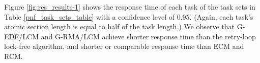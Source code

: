 \documentclass[a4paper,english]{article}
\begin{document}
Figure \ref{fig:res_results-1} shows the response time of each task of the task sets in Table \ref{pnf_task_sets_table} with a confidence level of 0.95. (Again, each task's atomic section length is equal to half of the task length.) 
We observe that G-EDF/LCM and G-RMA/LCM achieve shorter 
response time than the retry-loop lock-free
algorithm, and shorter 
or comparable response time than ECM and RCM.

\begin{figure}[htbp]
\end{figure}
\end{document}

